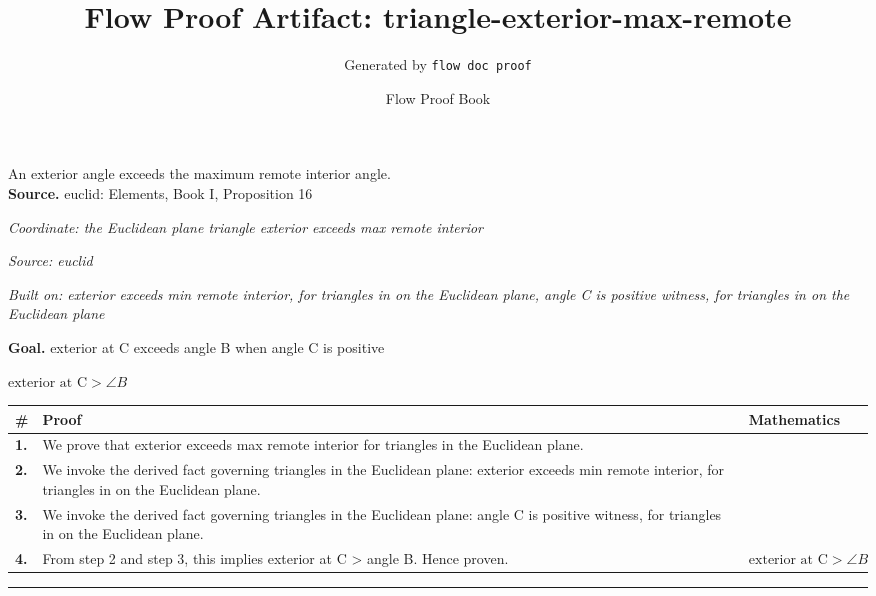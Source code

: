\documentclass[11pt]{article}
\title{Flow Proof Artifact: triangle-exterior-max-remote}
\author{Generated by \texttt{flow doc proof}}
\date{Flow Proof Book}
\theoremstyle{definition}
\begin{document}
\maketitle
An exterior angle exceeds the maximum remote interior angle.\\[0.5em]
\textbf{Source.} euclid: Elements, Book I, Proposition 16\\[0.5em]
\bigskip
{}\par
\smallskip\noindent\textit{Coordinate: the Euclidean plane \cdot triangle \cdot exterior exceeds max remote interior}\par
\smallskip\noindent\textit{Source: euclid}\par
\smallskip\noindent\textit{Built on: exterior exceeds min remote interior, for triangles in on the Euclidean plane, angle C is positive witness, for triangles in on the Euclidean plane}\par
\medskip
\noindent\textbf{Goal.} exterior at C exceeds angle B when angle C is positive\par
\noindent$\displaystyle \text{exterior at C} > \angle B$\par
\medskip
\noindent
\begin{tabular}{@{} >{\raggedright\arraybackslash}p{} >{\raggedright\arraybackslash}p{} >{\raggedleft\arraybackslash}p{} @{}}
\textbf{\#} & \textbf{Proof} & \textbf{Mathematics} \\
\midrule
\textbf{1.} & We prove that exterior exceeds max remote interior for triangles in the Euclidean plane. & \\[0.45em]
\textbf{2.} & We invoke the derived fact governing triangles in the Euclidean plane: exterior exceeds min remote interior, for triangles in on the Euclidean plane. & \\[0.45em]
\textbf{3.} & We invoke the derived fact governing triangles in the Euclidean plane: angle C is positive witness, for triangles in on the Euclidean plane. & \\[0.45em]
\textbf{4.} & From step 2 and step 3, this implies exterior at C > angle B. Hence proven. & $\displaystyle \text{exterior at C} > \angle B$ \\[0.45em]
\bottomrule
\end{tabular}
\label{thm:Geometry-triangle-exterior_exceeds_max_remote_interior}
\par\medskip\hrule
\end{document}
